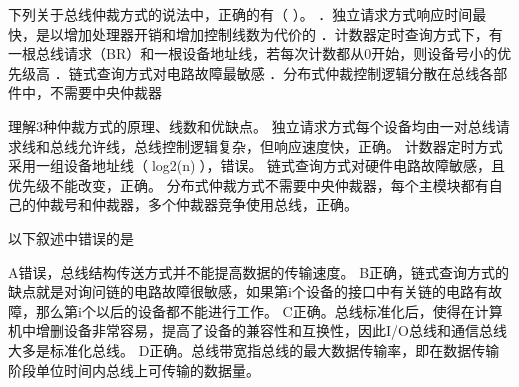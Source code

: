 \question 下列关于总线仲裁方式的说法中，正确的有（ ）。
．独立请求方式响应时间最快，是以增加处理器开销和增加控制线数为代价的
．计数器定时查询方式下，有一根总线请求（BR）和一根设备地址线，若每次计数都从0开始，则设备号小的优先级高
．链式查询方式对电路故障最敏感
．分布式仲裁控制逻辑分散在总线各部件中，不需要中央仲裁器
\par{}
\begin{solution}理解3种仲裁方式的原理、线数和优缺点。
独立请求方式每个设备均由一对总线请求线和总线允许线，总线控制逻辑复杂，但响应速度快，正确。
计数器定时方式采用一组设备地址线（log2(n)），错误。
链式查询方式对硬件电路故障敏感，且优先级不能改变，正确。
分布式仲裁方式不需要中央仲裁器，每个主模块都有自己的仲裁号和仲裁器，多个仲裁器竞争使用总线，正确。
\end{solution}
\question 以下叙述中错误的是
\par{}
\begin{solution}A错误，总线结构传送方式并不能提高数据的传输速度。
B正确，链式查询方式的缺点就是对询问链的电路故障很敏感，如果第i个设备的接口中有关链的电路有故障，那么第i个以后的设备都不能进行工作。
C正确。总线标准化后，使得在计算机中增删设备非常容易，提高了设备的兼容性和互换性，因此I/O总线和通信总线大多是标准化总线。
D正确。总线带宽指总线的最大数据传输率，即在数据传输阶段单位时间内总线上可传输的数据量。
\end{solution}
